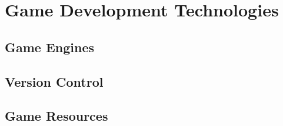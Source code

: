 \chapter{Game Development Technologies}
\section{Game Engines}
\section{Version Control}
\section{Game Resources}
